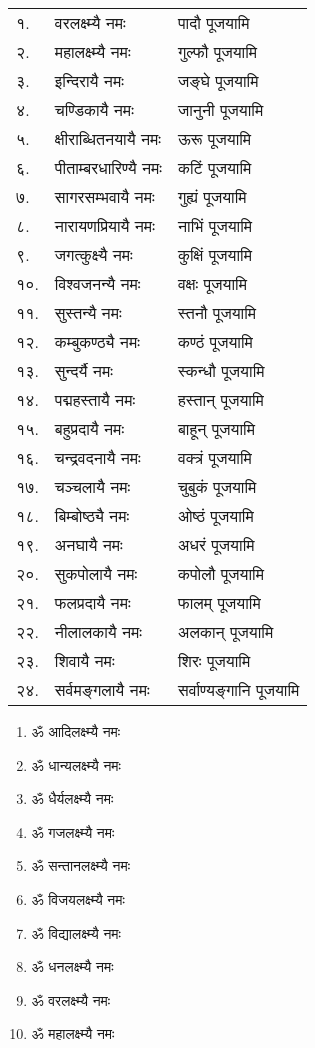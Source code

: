 \begin{longtable}{ll@{— }l}
१. & वरलक्ष्म्यै नमः & पादौ पूजयामि\\
२. & महालक्ष्म्यै नमः & गुल्फौ पूजयामि\\
३. & इन्दिरायै नमः &  जङ्घे पूजयामि\\
४. & चण्डिकायै नमः & जानुनी पूजयामि\\
५. & क्षीराब्धितनयायै नमः & ऊरू  पूजयामि\\
६. & पीताम्बरधारिण्यै नमः & कटिं पूजयामि\\
७. & सागरसम्भवायै नमः & गुह्यं पूजयामि\\
८. & नारायणप्रियायै नमः & नाभिं पूजयामि\\
९. & जगत्कुक्ष्यै नमः & कुक्षिं पूजयामि\\
१०. & विश्वजनन्यै नमः & वक्षः पूजयामि\\
११. & सुस्तन्यै नमः & स्तनौ पूजयामि\\
१२. & कम्बुकण्ठ्यै नमः &  कण्ठं पूजयामि\\
१३. & सुन्दर्यै नमः & स्कन्धौ पूजयामि\\
१४. & पद्महस्तायै नमः & हस्तान् पूजयामि\\
१५. & बहुप्रदायै नमः & बाहून् पूजयामि\\
१६. & चन्द्रवदनायै नमः & वक्त्रं पूजयामि\\
१७. & चञ्चलायै नमः & चुबुकं पूजयामि\\
१८. & बिम्बोष्ठ्यै नमः & ओष्ठं पूजयामि\\
१९. & अनघायै नमः & अधरं पूजयामि\\
२०. & सुकपोलायै नमः & कपोलौ पूजयामि\\
२१. & फलप्रदायै नमः & फालम् पूजयामि\\
२२. & नीलालकायै नमः & अलकान् पूजयामि\\
२३. & शिवायै नमः & शिरः पूजयामि\\
२४. & सर्वमङ्गलायै नमः &  सर्वाण्यङ्गानि पूजयामि\\
\end{longtable}


\begin{multicols}{2}
\begin{enumerate}
\item ॐ आदिलक्ष्म्यै नमः
\item ॐ धान्यलक्ष्म्यै नमः
\item ॐ धैर्यलक्ष्म्यै नमः
\item ॐ गजलक्ष्म्यै नमः
\item ॐ सन्तानलक्ष्म्यै नमः
\item ॐ विजयलक्ष्म्यै नमः
\item ॐ विद्यालक्ष्म्यै नमः
\item ॐ धनलक्ष्म्यै नमः
\item ॐ वरलक्ष्म्यै नमः
\item ॐ महालक्ष्म्यै नमः 
\end{enumerate}
\end{multicols}



